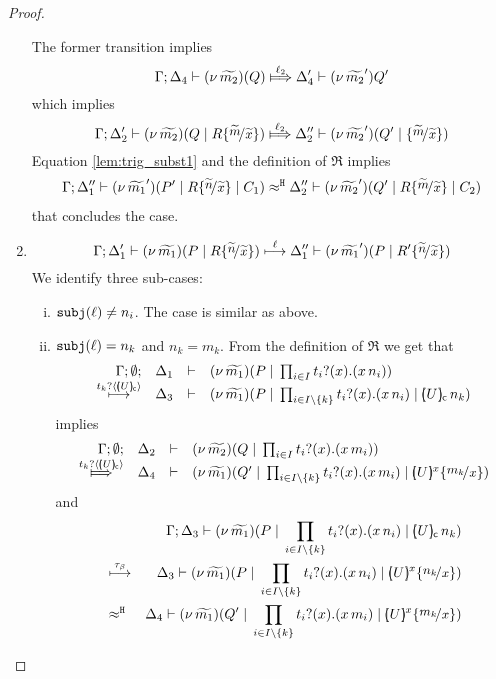 \begin{proof}
\begin{enumerate}
				The former transition implies
				\[
					\horel{\Gamma}{\Delta_4}{\newsp{\widetilde{m_2}}{Q }}
					{\Hby{\ell_2}}
					{\Delta_4'}{\news{\widetilde{m_2}'}{Q'}}
				\]
				which implies
				\[
					\horel{\Gamma}{\Delta_2'}{\newsp{\widetilde{m_2}}{Q \Par R \subst{\widetilde{m}}{\widetilde{x}}}}
					{\Hby{\ell_2}}
					{\Delta_2''}{\newsp{\widetilde{m_2}'}{Q' \Par \subst{\widetilde{m}}{\widetilde{x}} }}
				\]
				Equation \eqref{lem:trig_subst1} and the definition of $\Re$ implies
				\begin{eqnarray*}
					\horel{\Gamma}{\Delta_1''}{\newsp{\widetilde{m_1}'}{P' \Par R \subst{\widetilde{n}}{\widetilde{x}} \Par C_1}}
					{\hwb}
					{\Delta_2''}{\newsp{\widetilde{m_2}'}{Q' \Par R \subst{\widetilde{m}}{\widetilde{x}} \Par C_2 }}
				\end{eqnarray*}
				that concludes the case.

		\item	\[
					\horel{\Gamma}{\Delta_1'}{\newsp{\widetilde{m_1}}{P \Par R \subst{\widetilde{n}}{\widetilde{x}}  }}
					{\hby{\ell}}
					{\Delta_1''}{\newsp{\widetilde{m_1}'}{P \Par R' \subst{\widetilde{n}}{\widetilde{x}} }}
				\]
				We identify three sub-cases:
				\begin{enumerate}[i.]
					\item	$\mathtt{subj}(\ell) \not= n_i$. The case is similar as above.

					\item	$\mathtt{subj}(\ell) = n_k$ and $n_k = m_k$.
							From the definition of $\Re$ we get that
							\[
								\mhorel{\Gamma}{\Delta_1}{\newsp{\widetilde{m_1}}{P \Par \prod_{i \in I} \binp{t_i}{x} (\appl{x}{n_i})}}
								{\hby{ \bactinp{t_k}{\omapchar{U}}}}
								{\Delta_3}{}{\newsp{\widetilde{m_1}}{P \Par \prod_{i \in I\backslash{\set{k}}} \binp{t_i}{x} (\appl{x}{n_i}) \Par \appl{\omapchar{U}}{n_k}}}
							\]
							implies
							\[
								\mhorel{\Gamma}{\Delta_2}{\newsp{\widetilde{m_2}}{Q \Par \prod_{i \in I} \binp{t_i}{x} (\appl{x}{m_i})}}
								{\Hby{ \bactinp{t_k}{\omapchar{U}}}}
								{\Delta_4}{}{\newsp{\widetilde{m_1}}{Q' \Par \prod_{i \in I \backslash{\set{k}}} \binp{t_i}{x} (\appl{x}{m_i}) \Par \mapchar{U}{x} \subst{m_k}{x} }}
							\]
							and
							\begin{eqnarray*}
								&& \Gamma; \Delta_3 \proves \newsp{\widetilde{m_1}}{P \Par \prod_{i \in I \backslash{\set{k}}} \binp{t_i}{x} (\appl{x}{n_i}) \Par \appl{\omapchar{U}}{n_k}}
								\\
								&\hby{\tau_{\beta}}&
									\Delta_3 \proves \newsp{\widetilde{m_1}}{P \Par \prod_{i \in I \backslash{\set{k}}} \binp{t_i}{x} (\appl{x}{n_i}) \Par \mapchar{U}{x} \subst{n_k}{x}  }
								\\
								&\hwb&
									\Delta_4 \proves \newsp{\widetilde{m_1}}{Q' \Par \prod_{i \in I \backslash{\set{k}}} \binp{t_i}{x} (\appl{x}{m_i}) \Par \mapchar{U}{x} \subst{m_k}{x}}
							\end{eqnarray*}


\end{enumerate}
\end{enumerate}
\end{proof}
